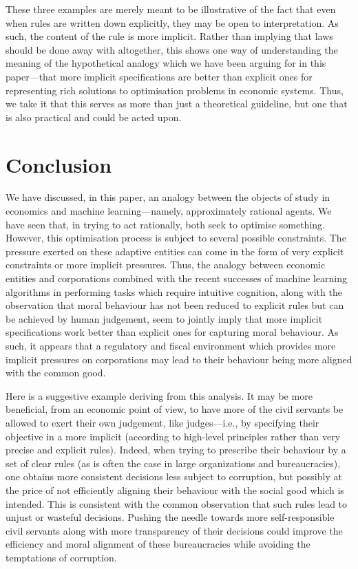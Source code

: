 \documentclass{amsart}
\theoremstyle{indented}
\theoremstyle{indentedProp}
\theoremstyle{indented}
\theoremstyle{indented}
\theoremstyle{indented}
\theoremstyle{indented}
\theoremstyle{indented}
\begin{document}
\phantom{a}

These three examples are merely meant to be illustrative of the fact that even when rules are written down explicitly, they may be open to interpretation. As such, the content of the rule is more implicit. Rather than implying that laws should be done away with altogether, this shows one way of understanding the meaning of the hypothetical analogy which we have been arguing for in this paper---that more implicit specifications are better than explicit ones for representing rich solutions to optimisation problems in economic systems. Thus, we take it that this serves as more than just a theoretical guideline, but one that is also practical and could be acted upon.



\section{Conclusion}
\label{sec:Conclusion}

We have discussed, in this paper, an analogy between the objects of study in economics and machine learning---namely, approximately rational agents. We have seen that, in trying to act rationally, both seek to optimise something. However, this optimisation process is subject to several possible constraints. The pressure exerted on these adaptive entities can come in the form of very explicit constraints or more implicit pressures. Thus, the analogy between economic entities and corporations combined with the recent successes of machine learning algorithms in performing tasks which require intuitive cognition, along with the observation that moral behaviour has not been reduced to explicit rules but can be achieved by human judgement, seem to jointly imply that more implicit specifications work better than explicit ones for capturing moral behaviour. As such, it appears that a regulatory and fiscal environment which provides more implicit pressures on corporations may lead to their behaviour being more aligned with the common good.

Here is a suggestive example deriving from this analysis. It may be more beneficial, from an economic point of view, to have more of the civil servants be allowed to exert their own judgement, like judges---i.e., by specifying their objective in a more implicit (according to high-level principles rather than very precise and explicit rules). Indeed, when trying to prescribe their behaviour by a set of clear rules (as is often the case in large organizations and bureaucracies), one obtains more consistent decisions less subject to corruption, but possibly at the price of not efficiently aligning their behaviour with the social good which is intended. This is consistent with the common observation that such rules lead to unjust or wasteful decisions. Pushing the needle towards more self-responsible civil servants along with more transparency of their decisions could improve the efficiency and moral alignment of these bureaucracies while avoiding the temptations of corruption. 
\end{document}
